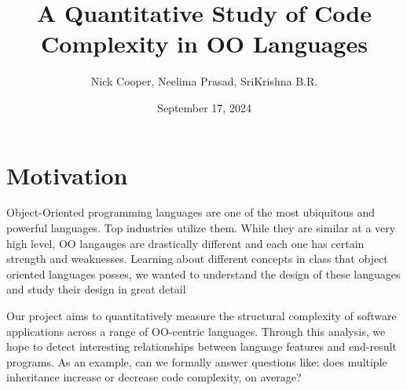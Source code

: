 \documentclass{article}
\title{A Quantitative Study of Code Complexity in OO Languages}
\author{Nick Cooper, Neelima Prasad, SriKrishna B.R.}
\date{September 17, 2024}
\begin{document}
\maketitle

\section{Motivation}
Object-Oriented programming languages are one of the most ubiquitous and powerful languages. Top industries utilize them. While they are similar at a very high level, OO langauges are drastically different and each one has certain strength and weaknesses. Learning about different concepts in class that object oriented languages posses, we wanted to understand the design of these languages and study their design in great detail 

Our project aims to quantitatively measure the structural complexity of software applications across a range of OO-centric languages. Through this analysis, we hope to detect interesting relationships between language features and end-result programs. As an example, can we formally answer questions like: does multiple inheritance increase or decrease code complexity, on average? 
\end{document}
